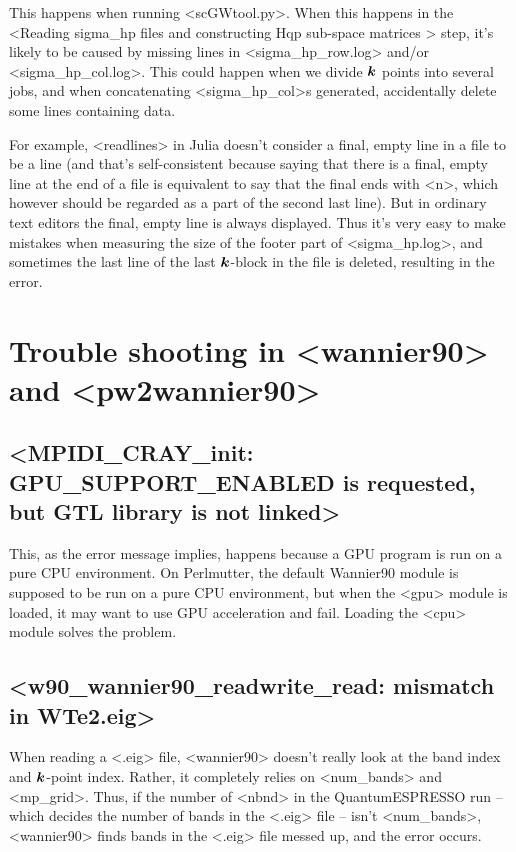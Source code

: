 \documentclass[hyperref, a4paper, 12pt]{report}
\def\\{}%
\def\texttt#1{<#1>}%
\newcommand{\shortcode}[1]{\texttt{#1}}
\begin{document}
This happens when running \shortcode{scGWtool.py}.
When this happens in the 
\shortcode{Reading sigma_hp files and constructing Hqp sub-space matrices } step,
it's likely to be caused by missing lines in
\shortcode{sigma_hp_row.log} and/or \shortcode{sigma_hp_col.log}.
This could happen when we divide $\vb*{k}$ points into several jobs,
and when concatenating \shortcode{sigma_hp_col}s generated, 
accidentally delete some lines containing data.

For example, \shortcode{readlines} in Julia 
doesn't consider a final, empty line in a file to be a line
(and that's self-consistent because 
saying that there is a final, empty line at the end of a file 
is equivalent to say that the final ends with \shortcode{\\n},
which however should be regarded as a part of the second last line).
But in ordinary text editors the final, empty line 
is always displayed.
Thus it's very easy to make mistakes when measuring the size 
of the footer part of \shortcode{sigma_hp.log},
and sometimes the last line of the last $\vb*{k}$-block in the file 
is deleted, resulting in the error.

\section{Trouble shooting in \shortcode{wannier90} and \shortcode{pw2wannier90}}

\subsection{\shortcode{MPIDI_CRAY_init: GPU_SUPPORT_ENABLED is requested, but GTL library is not linked}}

This, as the error message implies, happens because a GPU program is run on a pure CPU environment.
On Perlmutter, the default Wannier90 module is supposed to be run on a pure CPU environment,
but when the \shortcode{gpu} module is loaded, 
it may want to use GPU acceleration and fail.
Loading the \shortcode{cpu} module solves the problem.

\subsection{\shortcode{w90_wannier90_readwrite_read: mismatch in WTe2.eig}}\label{sec:wannier.mismatch-eig}

When reading a \shortcode{.eig} file, 
\shortcode{wannier90} doesn't really look at the band index and $\vb*{k}$-point index.
Rather, it completely relies on \shortcode{num_bands} and \shortcode{mp_grid}.
Thus, if the number of \shortcode{nbnd} in the QuantumESPRESSO run -- 
which decides the number of bands in the \shortcode{.eig} file -- 
isn't \shortcode{num_bands}, 
\shortcode{wannier90} finds bands in the \shortcode{.eig} file messed up,
and the error occurs.
\end{document}
